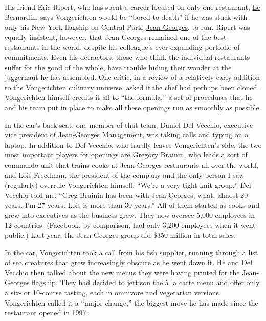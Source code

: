 His friend Eric Ripert, who has spent a career focused on only one
restaurant,
\href{https://www.nytimes.com/2012/05/23/dining/reviews/le-bernardin-in-midtown-manhattan.html}{Le
Bernardin}, says Vongerichten would be ``bored to death'' if he was
stuck with only his New York flagship on Central Park,
\href{https://www.nytimes.com/2014/04/09/dining/restaurant-review-jean-georges-on-the-upper-west-side.html}{Jean-Georges},
to run. Ripert was equally insistent, however, that Jean-Georges
remained one of the best restaurants in the world, despite his
colleague's ever-expanding portfolio of commitments. Even his
detractors, those who think the individual restaurants suffer for the
good of the whole, have trouble hiding their wonder at the juggernaut he
has assembled. One critic, in a review of a relatively early addition to
the Vongerichten culinary universe, asked if the chef had perhaps been
cloned. Vongerichten himself credits it all to ``the formula,'' a set of
procedures that he and his team put in place to make all these openings
run as smoothly as possible.

In the car's back seat, one member of that team, Daniel Del Vecchio,
executive vice president of Jean-Georges Management, was taking calls
and typing on a laptop. In addition to Del Vecchio, who hardly leaves
Vongerichten's side, the two most important players for openings are
Gregory Brainin, who leads a sort of commando unit that trains cooks at
Jean-Georges restaurants all over the world, and Lois Freedman, the
president of the company and the only person I saw (regularly) overrule
Vongerichten himself. ``We're a very tight-knit group,'' Del Vecchio
told me. ``Greg Brainin has been with Jean-Georges, what, almost 20
years. I'm 27 years. Lois is more than 30 years.'' All of them started
as cooks and grew into executives as the business grew. They now oversee
5,000 employees in 12 countries. (Facebook, by comparison, had only
3,200 employees when it went public.) Last year, the Jean-Georges group
did \$350 million in total sales.

In the car, Vongerichten took a call from his fish supplier, running
through a list of sea creatures that grew increasingly obscure as he
went down it. He and Del Vecchio then talked about the new menus they
were having printed for the Jean-Georges flagship. They had decided to
jettison the à la carte menu and offer only a six- or 10-course tasting,
each in omnivore and vegetarian versions. Vongerichten called it a
``major change,'' the biggest move he has made since the restaurant
opened in 1997.

